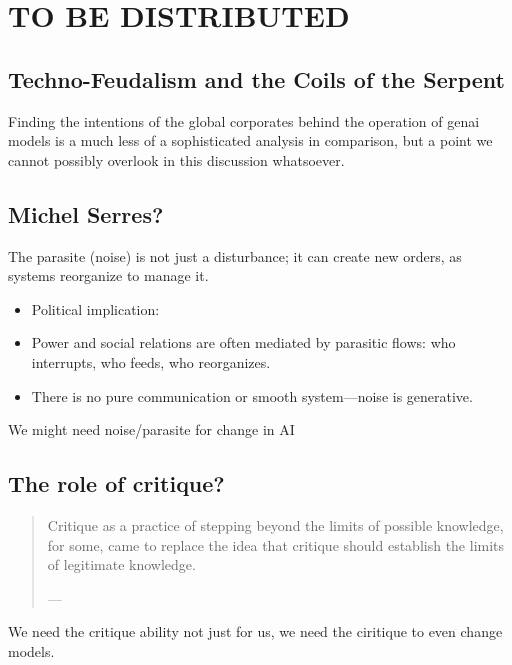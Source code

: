 \chapter{TO BE DISTRIBUTED}



\section{Techno-Feudalism and the Coils of the Serpent}
Finding the intentions of the global corporates behind the operation of \gls{genai} models is a much less of a sophisticated analysis in comparison, but a point
we cannot possibly overlook in this discussion whatsoever.


\section{Michel Serres?}


The parasite (noise) is not just a disturbance; it can create new orders, as systems reorganize to manage it.
\begin{itemize}
	\item Political implication:
	\item Power and social relations are often mediated by parasitic flows: who interrupts, who feeds, who reorganizes.
	\item There is no pure communication or smooth system—noise is generative.

\end{itemize}

We might need noise/parasite for change in AI

\section{The role of critique?}

\begin{quote}
	Critique as a practice of stepping beyond the limits of possible  knowledge, for some, came to replace the idea that critique should establish the  limits of legitimate knowledge.

	— \cite[17]{mackenzie2021}
\end{quote}

We need the critique ability not just for us, we need the ciritique to even
change models.


